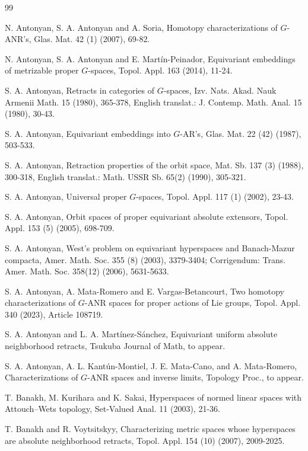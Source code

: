 \documentclass[12pt]{amsart}
\theoremstyle{definition}
\begin{document}
	
	\begin{thebibliography}{99}
		
		
		  N. Antonyan, S. A. Antonyan  and A. Soria, Homotopy characterizations of  $G$-ANR's, Glas. Mat. 42 (1) (2007), 69-82.
					
		  N. Antonyan, S. A. Antonyan  and E. Martín-Peinador, Equivariant embeddings of metrizable proper $G$-spaces, Topol. Appl. 163 (2014), 11-24. 
		
		 S. A. Antonyan,  Retracts in categories of $G$-spaces, Izv. Nats. Akad. Nauk Armenii Math. 15 (1980), 365-378, English translat.:  J. Contemp. Math. Anal. 15 (1980), 30-43.
		
		 S. A. Antonyan, Equivariant embeddings into $G$-AR's,  Glas. Mat. 22 (42) (1987), 503-533.
		
		 S. A. Antonyan,   Retraction properties of the orbit space,  Mat. Sb. 137 (3) (1988), 300-318, English translat.: Math. USSR Sb. 65(2) (1990), 305-321.
		
		 S. A. Antonyan, Universal proper $G$-spaces, Topol. Appl. 117 (1) (2002), 23-43.
		
		 S. A. Antonyan, Orbit spaces of proper equivariant absolute extensors, Topol. Appl. 153 (5) (2005), 698-709.
		
		 S. A. Antonyan, West’s problem on equivariant hyperspaces and Banach-Mazur compacta,  Amer. Math. Soc.  355 (8) (2003), 3379-3404; Corrigendum: Trans. Amer. Math. Soc. 358(12) (2006), 5631-5633.
		
		 S. A. Antonyan, A. Mata-Romero and E. Vargas-Betancourt,  Two homotopy characterizations of $G$-ANR spaces for proper actions of Lie groups, Topol. Appl. 340 (2023), Article 108719.
		
		 S. A. Antonyan and  L. A. Martínez-Sánchez,  Equivariant uniform absolute neighborhood retracts, Tsukuba Journal of Math, to appear.
		
		 S. A. Antonyan, A. L. Kantún-Montiel, J. E. Mata-Cano, and A. Mata-Romero, Characterizations of  $G$-ANR spaces and inverse limits, Topology Proc., to appear.
		
		 T. Banakh, M. Kurihara and K. Sakai,  Hyperspaces of normed linear spaces with Attouch–Wets topology, Set-Valued Anal. 11 (2003), 21-36.
		
		 T. Banakh and R. Voytsitskyy,  Characterizing metric spaces whose hyperspaces are absolute neighborhood retracts, Topol. Appl. 154 (10) (2007), 2009-2025.
		

\end{thebibliography}
\end{document}

